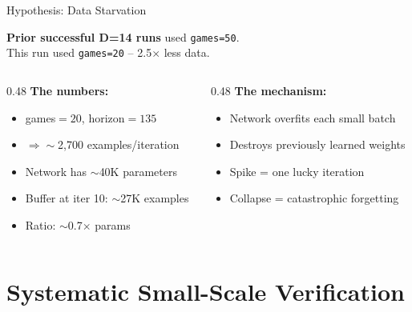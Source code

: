 \documentclass[aspectratio=169, 10pt]{beamer}
\begin{document}
\begin{frame}{Hypothesis: Data Starvation}

\textbf{Prior successful D=14 runs} used \texttt{games=50}.\\
This run used \texttt{games=20} -- 2.5$\times$ less data.

\vspace{0.4cm}
\begin{columns}[T]
\begin{column}{0.48\textwidth}
\textbf{The numbers:}
\begin{itemize}
  \item games$=20$, horizon$=135$
  \item $\Rightarrow \sim$2{,}700 examples/iteration
  \item Network has $\sim$40K parameters
  \item Buffer at iter 10: $\sim$27K examples
  \item Ratio: $\sim$0.7$\times$ params
\end{itemize}
\end{column}
\begin{column}{0.48\textwidth}
\textbf{The mechanism:}
\begin{itemize}
  \item Network overfits each small batch
  \item Destroys previously learned weights
  \item Spike = one lucky iteration
  \item Collapse = catastrophic forgetting
\end{itemize}
\end{column}
\end{columns}

\vspace{0.5cm}
\begin{center}
\end{center}
\end{frame}

\section{Systematic Small-Scale Verification}
\end{document}
